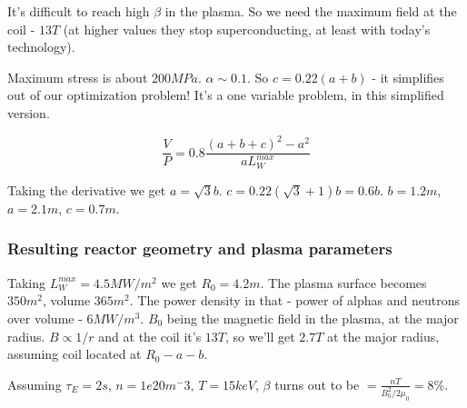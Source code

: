 \documentclass[PlasmaNotes.tex]{subfiles}
\begin{document}
It's difficult to reach high $\beta$ in the plasma. So we need the maximum field at the coil - $13 T$ (at higher values they stop superconducting, at least with today's technology).

Maximum stress is about $200 MPa$. $\alpha \sim 0.1$. So $c=0.22(a+b)$ - it simplifies out of our optimization problem! It's a one variable problem, in this simplified version.

\[
 \frac{V}{P} = 0.8 \frac{(a+b+c)^2-a^2}{a L_W^{max}}
\]

Taking the derivative we get $a=\sqrt{3} b$. $c=0.22(\sqrt{3}+1)b=0.6b$. $b=1.2m$, $a=2.1m$, $c=0.7m$.

\subsubsection{Resulting reactor geometry and plasma parameters}

Taking $L_W^{max} = 4.5 MW/m^2$ we get $R_0 = 4.2m$. The plasma surface becomes $350m^2$, volume $365m^2$. The power density in that - power of alphas and neutrons over volume - $6 MW/m^3$. $B_0$ being the magnetic field in the plasma, at the major radius. $B \propto 1/r$ and at the coil it's $13 T$, so we'll get $2.7 T$ at the major radius, assuming coil located at $R_0-a-b$.

Assuming $\tau_E = 2s$, $n=1e20 m^-3$, $T=15 keV$, $\beta$ turns out to be $= \frac{n T}{B_0^2/2\mu_0} = 8\%$.
\end{document}
